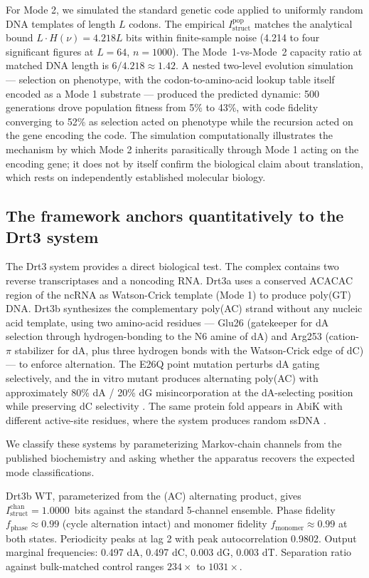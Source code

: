 \documentclass[aps,prx,reprint,amsmath,amssymb,floatfix,superscriptaddress,nofootinbib]{revtex4-2}
\theoremstyle{plain-thm}
\theoremstyle{definition-thm}
\newcommand{\Istructpop}{I_{\mathrm{struct}}^{\mathrm{pop}}}
\newcommand{\Istructchan}{I_{\mathrm{struct}}^{\mathrm{chan}}}
\newcommand{\fphase}{f_{\mathrm{phase}}}
\newcommand{\fmonomer}{f_{\mathrm{monomer}}}
\begin{document}
For Mode 2, we simulated the standard genetic code applied to uniformly random DNA templates of length $L$ codons. The empirical $\Istructpop$ matches the analytical bound $L \cdot H(\nu) = 4.218L$ bits within finite-sample noise (4.214 to four significant figures at $L = 64$, $n = 1000$). The Mode~1-vs-Mode~2 capacity ratio at matched DNA length is $6/4.218 \approx 1.42$. A nested two-level evolution simulation --- selection on phenotype, with the codon-to-amino-acid lookup table itself encoded as a Mode 1 substrate --- produced the predicted dynamic: 500 generations drove population fitness from 5\% to 43\%, with code fidelity converging to 52\% as selection acted on phenotype while the recursion acted on the gene encoding the code. The simulation computationally illustrates the mechanism by which Mode 2 inherits parasitically through Mode 1 acting on the encoding gene; it does not by itself confirm the biological claim about translation, which rests on independently established molecular biology.

\subsection{The framework anchors quantitatively to the Drt3 system}

The Drt3 system \citep{Deng2026} provides a direct biological test. The complex contains two reverse transcriptases and a noncoding RNA. Drt3a uses a conserved ACACAC region of the ncRNA as Watson-Crick template (Mode 1) to produce poly(GT) DNA. Drt3b synthesizes the complementary poly(AC) strand without any nucleic acid template, using two amino-acid residues --- Glu26 (gatekeeper for dA selection through hydrogen-bonding to the N6 amine of dA) and Arg253 (cation-$\pi$ stabilizer for dA, plus three hydrogen bonds with the Watson-Crick edge of dC) --- to enforce alternation. The E26Q point mutation perturbs dA gating selectively, and the in vitro mutant produces alternating poly(AC) with approximately 80\% dA / 20\% dG misincorporation at the dA-selecting position while preserving dC selectivity \citep[Fig. 4J]{Deng2026}. The same protein fold appears in AbiK with different active-site residues, where the system produces random ssDNA \citep{Deng2026}.

We classify these systems by parameterizing Markov-chain channels from the published biochemistry and asking whether the apparatus recovers the expected mode classifications.

Drt3b WT, parameterized from the (AC) alternating product, gives $\Istructchan = 1.0000$~bits against the standard 5-channel ensemble. Phase fidelity $\fphase \approx 0.99$ (cycle alternation intact) and monomer fidelity $\fmonomer \approx 0.99$ at both states. Periodicity peaks at lag 2 with peak autocorrelation 0.9802. Output marginal frequencies: 0.497 dA, 0.497 dC, 0.003 dG, 0.003 dT. Separation ratio against bulk-matched control ranges $234\times$ to $1031\times$.
\end{document}
